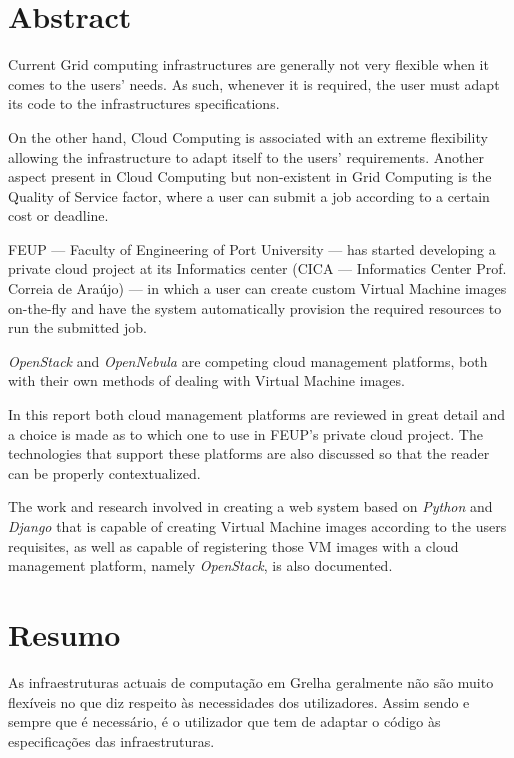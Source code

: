 \chapter*{Abstract}

Current Grid computing infrastructures are generally not very flexible when it comes to the users' needs. As such, whenever it is required, the user must adapt its code to the infrastructures specifications.

On the other hand, Cloud Computing is associated with an extreme flexibility allowing the infrastructure to adapt itself to the users' requirements. Another aspect present in Cloud Computing but non-existent in Grid Computing is the Quality of Service factor, where a user can submit a job according to a certain cost or deadline.

FEUP --- Faculty of Engineering of Port University --- has started developing a private cloud project at its Informatics center (CICA --- Informatics Center Prof. Correia de Araújo) --- in which a user can create custom Virtual Machine images on-the-fly and have the system automatically provision the required resources to run the submitted job.

\textit{OpenStack} and \textit{OpenNebula} are competing cloud management platforms, both with their own methods of dealing with Virtual Machine images. 

In this report both cloud management platforms are reviewed in great detail and a choice is made as to which one to use in FEUP's private cloud project. The technologies that support these platforms are also discussed so that the reader can be properly contextualized.

The work and research involved in creating a web system based on \textit{Python} and \textit{Django} that is capable of creating Virtual Machine images according to the users requisites, as well as capable of registering those VM images with a cloud management platform, namely \textit{OpenStack}, is also documented.


\chapter*{Resumo}

As infraestruturas actuais de computação em Grelha geralmente não são muito flexíveis no que diz respeito às necessidades dos utilizadores. Assim sendo e sempre que é necessário, é o utilizador que tem de adaptar o código às especificações das infraestruturas.

